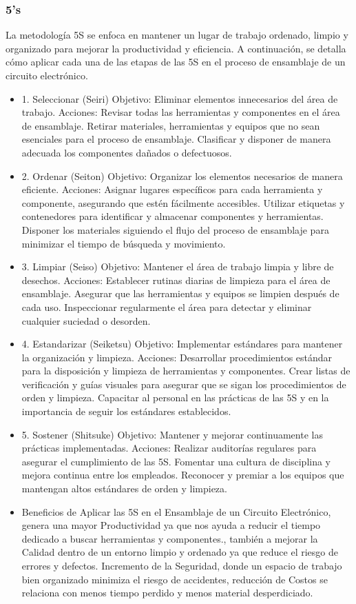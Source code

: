     \subsubsection{5's}
    La metodología 5S se enfoca en mantener un lugar de trabajo ordenado, limpio y organizado para mejorar la productividad y eficiencia. A continuación, se detalla cómo aplicar cada una de las etapas de las 5S en el proceso de ensamblaje de un circuito electrónico.
    \begin{itemize}
    \item 1. Seleccionar (Seiri)
    Objetivo: Eliminar elementos innecesarios del área de trabajo.
    Acciones:
    Revisar todas las herramientas y componentes en el área de ensamblaje.
    Retirar materiales, herramientas y equipos que no sean esenciales para el proceso de ensamblaje.
    Clasificar y disponer de manera adecuada los componentes dañados o defectuosos.
    \item 2. Ordenar (Seiton)
    Objetivo: Organizar los elementos necesarios de manera eficiente.
    Acciones:
    Asignar lugares específicos para cada herramienta y componente, asegurando que estén fácilmente accesibles.
    Utilizar etiquetas y contenedores para identificar y almacenar componentes y herramientas.
    Disponer los materiales siguiendo el flujo del proceso de ensamblaje para minimizar el tiempo de búsqueda y movimiento.
    \item 3. Limpiar (Seiso)
    Objetivo: Mantener el área de trabajo limpia y libre de desechos.
    Acciones:
    Establecer rutinas diarias de limpieza para el área de ensamblaje.
    Asegurar que las herramientas y equipos se limpien después de cada uso.
    Inspeccionar regularmente el área para detectar y eliminar cualquier suciedad o desorden.
    \item 4. Estandarizar (Seiketsu)
    Objetivo: Implementar estándares para mantener la organización y limpieza.
    Acciones:
    Desarrollar procedimientos estándar para la disposición y limpieza de herramientas y componentes.
    Crear listas de verificación y guías visuales para asegurar que se sigan los procedimientos de orden y limpieza.
    Capacitar al personal en las prácticas de las 5S y en la importancia de seguir los estándares establecidos.
    \item 5. Sostener (Shitsuke)
    Objetivo: Mantener y mejorar continuamente las prácticas implementadas.
    Acciones:
    Realizar auditorías regulares para asegurar el cumplimiento de las 5S.
    Fomentar una cultura de disciplina y mejora continua entre los empleados.
    Reconocer y premiar a los equipos que mantengan altos estándares de orden y limpieza.
    \item Beneficios de Aplicar las 5S en el Ensamblaje de un Circuito Electrónico, genera una mayor Productividad ya que nos ayuda a reducir el tiempo dedicado a buscar herramientas y componentes., también a mejorar la Calidad dentro de un entorno limpio y ordenado ya que reduce el riesgo de errores y defectos.\cite{Gutierrez}
    Incremento de la Seguridad, donde un espacio de trabajo bien organizado minimiza el riesgo de accidentes, reducción de Costos se relaciona con menos tiempo perdido y menos material desperdiciado.
    
    \end{itemize}
